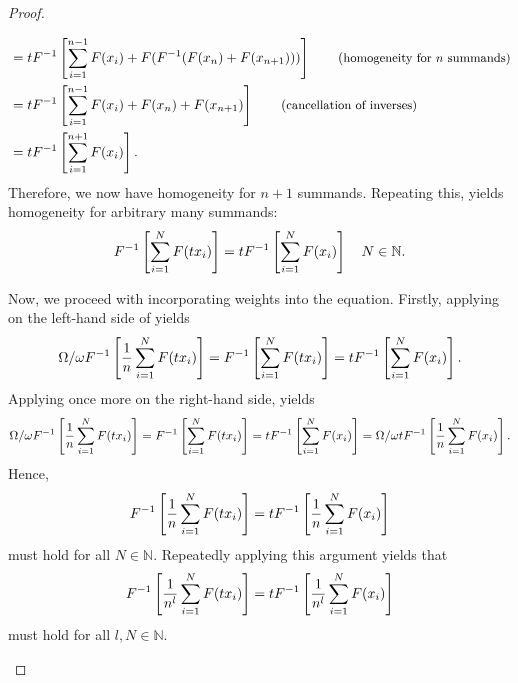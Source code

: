 \begin{proof}
\begin{proofpart}
\begin{proofpp}
{\begin{align*}
				                                                 & = t F^{-1} \left[ \sum_{i=1}^{n-1} F(\ta_i) + F ( F^{-1} ( F(\ta_{n}) + F(\ta_{n+1}) )) \right] \tag{\small{homogeneity for $n$ summands}}                            \\
				                                                 & = t F^{-1} \left[ \sum_{i=1}^{n-1} F(\ta_i) + F(\ta_{n}) + F(\ta_{n+1}) \right] \tag{\small{cancellation of inverses}}                                                \\
				                                                 & = t F^{-1} \left[ \sum_{i=1}^{n+1} F(\ta_i) \right].
			\end{align*}
			}
			Therefore, we now have homogeneity for $n+1$ summands. Repeating this, yields homogeneity for arbitrary many summands:
			\begin{equation} \label{proof-homogen-kbig}
				F^{-1} \left[ \sum_{i=1}^{N} F(t x_i) \right] = t F^{-1} \left[ \sum_{i=1}^{N} F(x_i) \right] \quad N \in \mathbb{N}.
			\end{equation}
		\end{proofpp}

		\begin{proofpp}
			Now, we proceed with incorporating weights into the equation. Firstly, applying  on the left-hand side of  yields
			\begin{equation*}
				\Omega / \omega F^{-1} \left[ \frac{1}{n} \sum_{i=1}^{N} F(t x_i) \right] = F^{-1} \left[ \sum_{i=1}^{N} F(t x_i) \right] = t F^{-1} \left[ \sum_{i=1}^{N} F(x_i) \right] .
			\end{equation*}
			Applying  once more on the right-hand side, yields
      {\small \begin{equation*}
				\Omega / \omega F^{-1} \left[ \frac{1}{n} \sum_{i=1}^{N} F(t x_i) \right] = F^{-1} \left[ \sum_{i=1}^{N} F(t x_i) \right] = t F^{-1} \left[ \sum_{i=1}^{N} F(x_i) \right] =\Omega / \omega t F^{-1} \left[ \frac{1}{n} \sum_{i=1}^{N} F(x_i) \right].
    \end{equation*}}
			Hence,
			\begin{equation*}
				F^{-1} \left[ \frac{1}{n} \sum_{i=1}^{N} F(t x_i) \right] = t F^{-1} \left[ \frac{1}{n} \sum_{i=1}^{N} F(x_i) \right]
			\end{equation*}
			must hold for all $N \in \mathbb{N}$. Repeatedly applying this argument yields that
			\begin{equation} \label{proof-homogen-prower-weights}
				F^{-1} \left[ \frac{1}{n^l} \sum_{i=1}^{N} F(t x_i) \right] = t F^{-1} \left[ \frac{1}{n^l} \sum_{i=1}^{N} F(x_i) \right]
			\end{equation}
			must hold for all $l, N \in \mathbb{N}$.


\end{proofpp}
\end{proofpart}
\end{proof}
